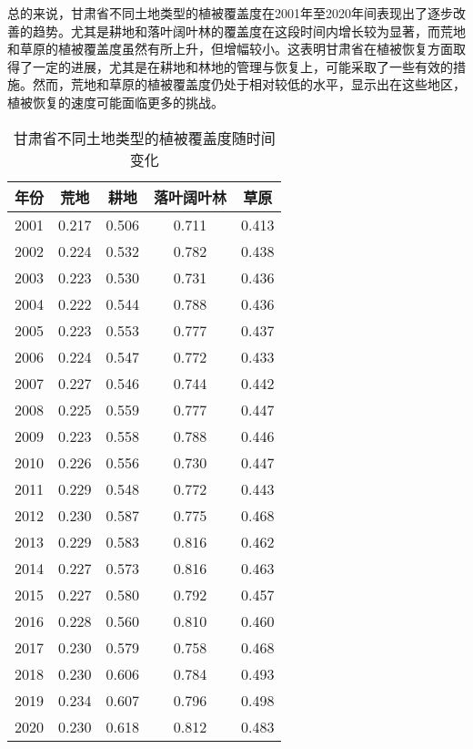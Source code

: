 \documentclass{article}
\begin{document}
		总的来说，甘肃省不同土地类型的植被覆盖度在2001年至2020年间表现出了逐步改善的趋势。尤其是耕地和落叶阔叶林的覆盖度在这段时间内增长较为显著，而荒地和草原的植被覆盖度虽然有所上升，但增幅较小。这表明甘肃省在植被恢复方面取得了一定的进展，尤其是在耕地和林地的管理与恢复上，可能采取了一些有效的措施。然而，荒地和草原的植被覆盖度仍处于相对较低的水平，显示出在这些地区，植被恢复的速度可能面临更多的挑战。
		
		\begin{table}[H]
			\centering
			\begin{tabular}{|c|c|c|c|c|}
				\hline
				\textbf{年份} & \textbf{荒地} & \textbf{耕地} & \textbf{落叶阔叶林} & \textbf{草原} \\
				\hline
				2001 & 0.217 & 0.506 & 0.711 & 0.413 \\
				2002 & 0.224 & 0.532 & 0.782 & 0.438 \\
				2003 & 0.223 & 0.530 & 0.731 & 0.436 \\
				2004 & 0.222 & 0.544 & 0.788 & 0.436 \\
				2005 & 0.223 & 0.553 & 0.777 & 0.437 \\
				2006 & 0.224 & 0.547 & 0.772 & 0.433 \\
				2007 & 0.227 & 0.546 & 0.744 & 0.442 \\
				2008 & 0.225 & 0.559 & 0.777 & 0.447 \\
				2009 & 0.223 & 0.558 & 0.788 & 0.446 \\
				2010 & 0.226 & 0.556 & 0.730 & 0.447 \\
				2011 & 0.229 & 0.548 & 0.772 & 0.443 \\
				2012 & 0.230 & 0.587 & 0.775 & 0.468 \\
				2013 & 0.229 & 0.583 & 0.816 & 0.462 \\
				2014 & 0.227 & 0.573 & 0.816 & 0.463 \\
				2015 & 0.227 & 0.580 & 0.792 & 0.457 \\
				2016 & 0.228 & 0.560 & 0.810 & 0.460 \\
				2017 & 0.230 & 0.579 & 0.758 & 0.468 \\
				2018 & 0.230 & 0.606 & 0.784 & 0.493 \\
				2019 & 0.234 & 0.607 & 0.796 & 0.498 \\
				2020 & 0.230 & 0.618 & 0.812 & 0.483 \\
				\hline
			\end{tabular}
			\caption{甘肃省不同土地类型的植被覆盖度随时间变化}
		\end{table}
\end{document}
